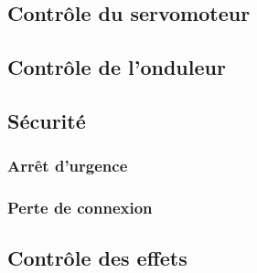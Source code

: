 			\subsection{Contrôle du servomoteur}
			\subsection{Contrôle de l'onduleur}
			\subsection{Sécurité}
				\subsubsection{Arrêt d'urgence}\label{secu}
				\subsubsection{Perte de connexion}
			\subsection{Contrôle des effets}